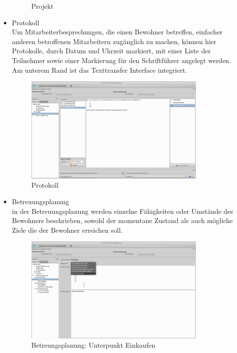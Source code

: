 \begin{itemize}
\begin{figure}[h!]
\begin{center}
			\caption{Projekt}
		\end{center}
	\end{figure}
	\FloatBarrier
	\newpage
	\item Protokoll\mbox{}\\
	\noindent
	Um Mitarbeiterbesprechungen, die einen Bewohner betreffen, einfacher anderen betroffenen Mitarbeitern zugänglich zu machen, können hier Protokolle, durch Datum und Uhrzeit markiert, mit einer Liste der Teilnehmer sowie einer Markierung für den Schriftführer angelegt werden.\\Am unterem Rand ist das Texttransfer Interface integriert.
	\begin{figure}[h!]
		\begin{center}
			\includegraphics[keepaspectratio=true, width=0.85\textwidth]{pics/client_protokoll.png}
			\caption{Protokoll}
		\end{center}
	\end{figure}
	\FloatBarrier
	\newpage
	\item Betreuungsplanung\mbox{}\\
	\noindent
	in der Betreuungsplanung werden einzelne Fähigkeiten oder Umstände des Bewohners beschrieben, sowohl der momentane Zustand als auch mögliche Ziele die der Bewohner erreichen soll.
	\begin{figure}[h!]
		\begin{center}
			\includegraphics[keepaspectratio=true, width=0.85\textwidth]{pics/client_lebensfuehrung.png}
			\caption{Betreungsplanung: Unterpunkt Einkaufen}
		\end{center}
	\end{figure}
\end{itemize}
\newpage
